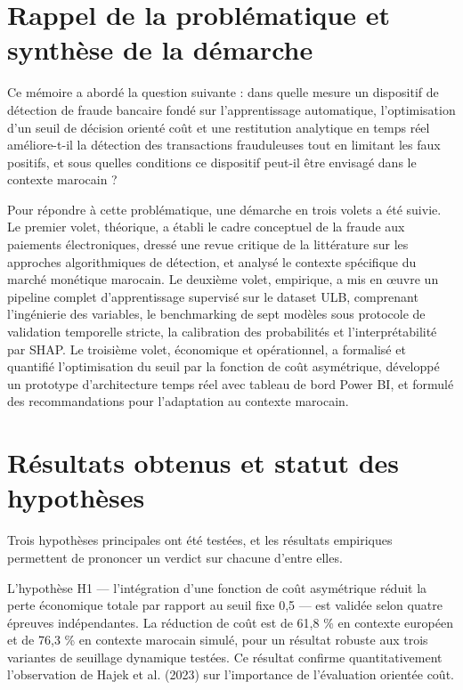 \section{Rappel de la problématique et synthèse de la démarche}

Ce mémoire a abordé la question suivante : dans quelle mesure un dispositif de détection de fraude bancaire fondé sur l'apprentissage automatique, l'optimisation d'un seuil de décision orienté coût et une restitution analytique en temps réel améliore-t-il la détection des transactions frauduleuses tout en limitant les faux positifs, et sous quelles conditions ce dispositif peut-il être envisagé dans le contexte marocain ?

Pour répondre à cette problématique, une démarche en trois volets a été suivie. Le premier volet, théorique, a établi le cadre conceptuel de la fraude aux paiements électroniques, dressé une revue critique de la littérature sur les approches algorithmiques de détection, et analysé le contexte spécifique du marché monétique marocain. Le deuxième volet, empirique, a mis en œuvre un pipeline complet d'apprentissage supervisé sur le dataset ULB, comprenant l'ingénierie des variables, le benchmarking de sept modèles sous protocole de validation temporelle stricte, la calibration des probabilités et l'interprétabilité par SHAP. Le troisième volet, économique et opérationnel, a formalisé et quantifié l'optimisation du seuil par la fonction de coût asymétrique, développé un prototype d'architecture temps réel avec tableau de bord Power BI, et formulé des recommandations pour l'adaptation au contexte marocain.

\section{Résultats obtenus et statut des hypothèses}

Trois hypothèses principales ont été testées, et les résultats empiriques permettent de prononcer un verdict sur chacune d'entre elles.

L'hypothèse H1 — l'intégration d'une fonction de coût asymétrique réduit la perte économique totale par rapport au seuil fixe 0,5 — est validée selon quatre épreuves indépendantes. La réduction de coût est de 61,8 \% en contexte européen et de 76,3 \% en contexte marocain simulé, pour un résultat robuste aux trois variantes de seuillage dynamique testées. Ce résultat confirme quantitativement l'observation de Hajek et al. (2023) sur l'importance de l'évaluation orientée coût.


